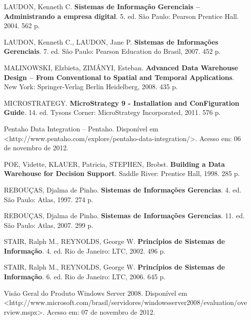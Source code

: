 \documentclass[a4paper]{article}
\begin{document}
{
\textsf{LAUDON, Kenneth C. }\textsf{\textbf{Sistemas de Informa\c{c}\~ao Gerenciais -- Administrando a empresa
digital}}\textsf{. 5. ed. S\~ao Paulo: Pearson Prentice Hall. 2004. 562 p. }}

{
\textsf{LAUDON, Kenneth C., LAUDON, Jane P. }\textsf{\textbf{Sistemas de Informa\c{c}\~oes Gerenciais}}\textsf{. 7. ed.
S\~ao Paulo: Pearson Education do Brasil, 2007. }\foreignlanguage{english}{\textsf{452 p. }}}

{
\foreignlanguage{english}{\textsf{MALINOWSKI, Elzbieta, ZIM\'ANYI, Esteban.
}}\foreignlanguage{english}{\textsf{\textbf{Advanced Data Warehouse Design -- From Conventional to Spatial and Temporal
Applications}}}\foreignlanguage{english}{\textsf{. New York: Springer-Verlag Berlin Heidelberg, 2008. 435 p. }}}

{
\foreignlanguage{english}{\textsf{MICROSTRATEGY. }}\foreignlanguage{english}{\textsf{\textbf{MicroStrategy 9 -
Installation and ConFiguration Guide}}}\foreignlanguage{english}{\textsf{. 14. ed. Tysons Corner: MicroStrategy
Incorporated, 2011. 576 p. }}}

{
\foreignlanguage{english}{\textsf{Pentaho Data Integration -- Pentaho. }}\textsf{Dispon\'ivel em
{\textless}http://www.pentaho.com/explore/pentaho-data-integration/{\textgreater}. Acesso em: 06 de novembro de 2012.}}

{
\foreignlanguage{english}{\textsf{POE, Vidette, KLAUER, Patricia, STEPHEN, Brobst.
}}\foreignlanguage{english}{\textsf{\textbf{Building a Data Warehouse for Decision
Support}}}\foreignlanguage{english}{\textsf{. }}\textsf{Saddle River: Prentice Hall, 1998. 285 p. }}

{
\textsf{REBOU\c{C}AS, Djalma de Pinho. }\textsf{\textbf{Sistemas de Informa\c{c}\~oes Gerencias}}\textsf{. 4. ed. S\~ao
Paulo: Atlas, 1997. 274 p. }}

{
\textsf{REBOU\c{C}AS, Djalma de Pinho. }\textsf{\textbf{Sistemas de Informa\c{c}\~oes Gerencias}}\textsf{. 11. ed. S\~ao
Paulo: Atlas, 2007. 299 p. }}

{
\textsf{STAIR, Ralph M., REYNOLDS, George W. }\textsf{\textbf{Princ\'ipios de Sistemas de Informa\c{c}\~ao}}\textsf{. 4.
ed. Rio de Janeiro: LTC, 2002. 496 p. }}

{
\textsf{STAIR, Ralph M., REYNOLDS, George W. }\textsf{\textbf{Princ\'ipios de Sistemas de Informa\c{c}\~ao}}\textsf{. 6.
ed. Rio de Janeiro: LTC, 2006. 645 p. }}

{
\textsf{Vis\~ao Geral do Produto Windows Server 2008. Dispon\'ivel em
{\textless}http://www.microsoft.com/brasil/servidores/windowsserver2008/evaluation/overview.mspx{\textgreater}. Acesso
em: 07 de novembro de 2012.}}


\bigskip
\end{document}
